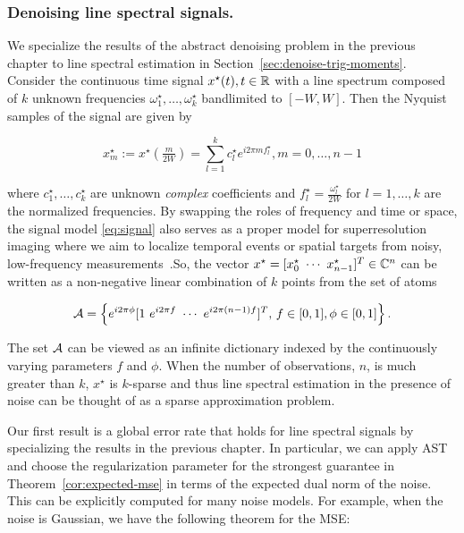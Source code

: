 \subsubsection{Denoising line spectral signals.} 

We specialize the results of the abstract denoising problem in the previous
chapter to line spectral estimation in Section~\ref{sec:denoise-trig-moments}.
Consider the continuous time signal $x^\star(t), t\in \mathbb{R}$ with a line spectrum composed of $k$ unknown frequencies $\omega_1^\star, \ldots, \omega_k^\star$ bandlimited to $[-W,W]$. Then the Nyquist samples of the signal are given by

\begin{equation}
\label{eq:signal}
 x^\star_m := x^\star\left(\tfrac{m}{2W}\right) = \sum_{l=1}^k c_l^\star e^{i 2 \pi m f_l^\star}, m = 0, \ldots, n-1
\end{equation}

where $c_1^\star, \ldots, c_k^\star$ are unknown \emph{complex} coefficients and
$f_l^\star = \tfrac{\omega_l^\star}{2W}$ for $l = 1, \ldots, k$ are the
normalized frequencies. By swapping the roles of frequency and time or space,
the signal model \eqref{eq:signal} also serves as a proper model for
superresolution imaging where we aim to localize temporal events or spatial
targets from noisy, low-frequency measurements~\cite{cg_exact12,cg_noisy}.So,
the vector $x^\star = [x^\star_0 ~ \cdots ~ x^\star_{n-1}]^T \in \mathbb{C}^n$ can be
written as a non-negative linear combination of $k$ points from the set of atoms

{\small
\[
\mathcal{A} = \left\{e^{i 2\pi \phi}[1 ~ e^{i2\pi f} ~ \cdots ~ e^{i2\pi (n-1) f}]^T,\, f \in [0,1], \phi \in [0,1] \right\}.
\]} 

The set $\mathcal{A}$ can be viewed as an infinite dictionary indexed by the continuously
varying parameters $f$ and $\phi$. When the number of observations, $n$, is much
greater than $k$, $x^\star$ is $k$-sparse and thus line spectral estimation in
the presence of noise can be thought of as a sparse approximation problem. 

Our first result is a global error rate that holds for line spectral signals by specializing the results in the previous chapter. In particular, we can apply AST and choose the regularization parameter for the strongest guarantee in Theorem~\ref{cor:expected-mse} in terms of the expected dual norm of the noise. This can be explicitly computed for many noise models. For example, when the
noise is Gaussian, we have the following theorem for the MSE:

